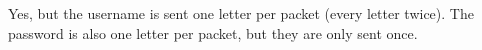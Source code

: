 Yes, but the username is sent one letter per packet (every letter twice). The password is also one letter per packet, but they are only sent once.